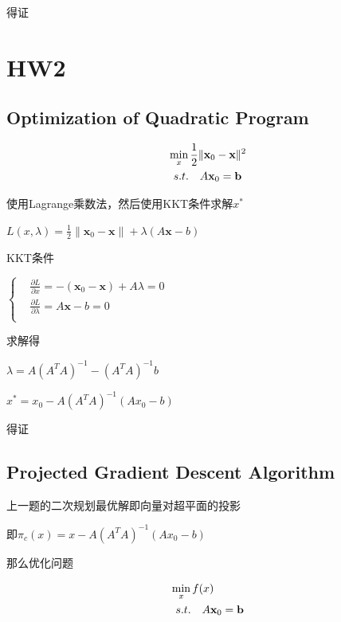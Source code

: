 \documentclass{xjtureport}
\begin{document}
得证
\section{HW2}

\subsection{Optimization of Quadratic Program}
\begin{equation}
    \begin{aligned} \label{P}
        & \min_{x} \frac{1}{2} \| \textbf{x}_0 - \textbf{x} \| ^2\\
        &\begin{array}[]{r@{\quad}r@{}l@{\quad}l}
        s.t.& A\textbf{x}_0 = \textbf{b}\\
        \end{array}
    \end{aligned}
\end{equation}

使用Lagrange乘数法，然后使用KKT条件求解$x^*$

$L(x,\lambda) = \frac{1}{2} \| \textbf{x}_0 - \textbf{x}\| + \lambda(A\textbf{x} - b)$

KKT条件

$\left\{\begin{matrix}
&\frac{\partial L}{\partial x} = -(\textbf{x}_0 - \textbf{x}) + A\lambda = 0\\
&\frac{\partial L}{\partial \lambda} = A\textbf{x} - b = 0\\
\end{matrix}\right.$

求解得

$\lambda = A(A^{T}A)^{-1} - (A^{T}A)^{-1}b$

$x^{*} = x_0 - A(A^{T}A)^{-1}(Ax_0-b)$

得证
\subsection{Projected Gradient Descent Algorithm}
上一题的二次规划最优解即向量对超平面的投影

即$\pi _c(x) = x - A(A^{T}A)^{-1}(Ax_0-b)$

那么优化问题

\begin{equation}
    \begin{aligned} \label{P}
        & \min_{x} f(x)\\
        &\begin{array}[]{r@{\quad}r@{}l@{\quad}l}
        s.t.& A\textbf{x}_0 = \textbf{b}\\
        \end{array}
    \end{aligned}
\end{equation}
\end{document}
